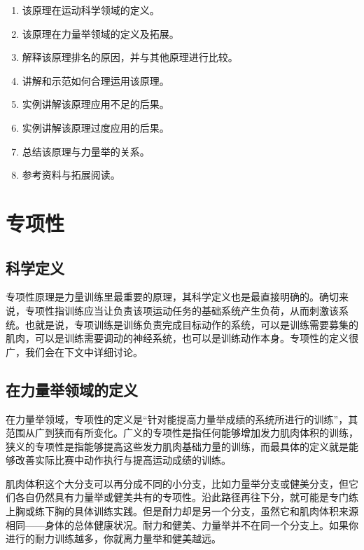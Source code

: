 \documentclass[fontset=fandol, a4paper, 12pt, openright]{ctexbook}
\begin{document}
\begin{enumerate}
    \item 该原理在运动科学领域的定义。
    \item 该原理在力量举领域的定义及拓展。
    \item 解释该原理排名的原因，并与其他原理进行比较。
    \item 讲解和示范如何合理运用该原理。
    \item 实例讲解该原理应用不足的后果。
    \item 实例讲解该原理过度应用的后果。
    \item 总结该原理与力量举的关系。
    \item 参考资料与拓展阅读。
\end{enumerate}

\chapter{专项性}

\section{科学定义}

专项性原理是力量训练里最重要的原理，其科学定义也是最直接明确的。确切来说，专项性指训练应当让负责该项运动任务的基础系统产生负荷，从而刺激该系统。也就是说，专项训练是训练负责完成目标动作的系统，可以是训练需要募集的肌肉，可以是训练需要调动的神经系统，也可以是训练动作本身。专项性的定义很广，我们会在下文中详细讨论。

\section{在力量举领域的定义}

在力量举领域，专项性的定义是“针对能提高力量举成绩的系统所进行的训练”，其范围从广到狭而有所变化。广义的专项性是指任何能够增加发力肌肉体积的训练，狭义的专项性是指能够提高这些发力肌肉基础力量的训练，而最具体的定义就是能够改善实际比赛中动作执行与提高运动成绩的训练。

肌肉体积这个大分支可以再分成不同的小分支，比如力量举分支或健美分支，但它们各自仍然具有力量举或健美共有的专项性。沿此路径再往下分，就可能是专门练上胸或练下胸的具体训练实践。但是耐力却是另一个分支，虽然它和肌肉体积来源相同——身体的总体健康状况。耐力和健美、力量举并不在同一个分支上。如果你进行的耐力训练越多，你就离力量举和健美越远。
\end{document}
